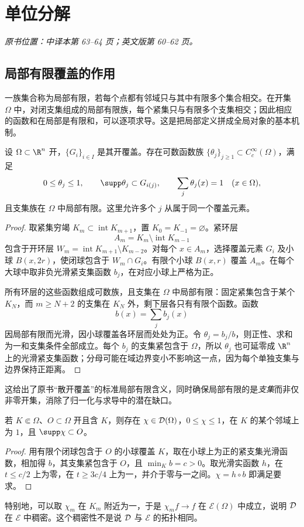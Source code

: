 \section{单位分解}\label{sec:yosida-01-12}
\noindent\textit{原书位置：中译本第 63--64 页；英文版第 60--62 页。}

\subsection{局部有限覆盖的作用}
一族集合称为局部有限，若每个点都有邻域只与其中有限多个集合相交。在开集 $\Omega$ 中，对闭支集组成的局部有限族，每个紧集只与有限多个支集相交；因此相应的函数和在局部是有限和，可以逐项求导。这是把局部定义拼成全局对象的基本机制。

\begin{theorem}[从属任意开覆盖的光滑单位分解]\label{thm:y1-partition}
设 $\Omega\subset\R^n$ 开，$\{G_i\}_{i\in I}$ 是其开覆盖。存在可数函数族 $\{\theta_j\}_{j\ge1}\subset C_c^\infty(\Omega)$，满足
\[
 0\le\theta_j\le1,\qquad \supp\theta_j\subset G_{i(j)},\qquad
 \sum_j\theta_j(x)=1\quad(x\in\Omega),
\]
且支集族在 $\Omega$ 中局部有限。这里允许多个 $j$ 从属于同一个覆盖元素。
\end{theorem}
\begin{proof}
取紧集穷竭 $K_m\subset\operatorname{int}K_{m+1}$，置 $K_0=K_{-1}=\varnothing$。紧环层
\[
 A_m=K_m\setminus\operatorname{int}K_{m-1}
\]
包含于开环层 $W_m=\operatorname{int}K_{m+1}\setminus K_{m-2}$。对每个 $x\in A_m$，选择覆盖元素 $G_i$ 及小球 $B(x,2r)$，使闭球包含于 $W_m\cap G_i$。有限个小球 $B(x,r)$ 覆盖 $A_m$。在每个大球中取非负光滑紧支集函数 $b_j$，在对应小球上严格为正。

所有环层的这些函数组成可数族，且支集在 $\Omega$ 中局部有限：固定紧集包含于某个 $K_N$，而 $m\ge N+2$ 的支集在 $K_N$ 外，剩下层各只有有限个函数。函数
\[
 b(x)=\sum_jb_j(x)
\]
因局部有限而光滑，因小球覆盖各环层而处处为正。令 $\theta_j=b_j/b$，则正性、求和为一和支集条件全部成立。每个 $b_j$ 的支集紧包含于 $\Omega$，所以 $\theta_j$ 也可延零成 $\R^n$ 上的光滑紧支集函数；分母可能在域边界变小不影响这一点，因为每个单独支集与边界保持正距离。
\end{proof}
这给出了原书“散开覆盖”的标准局部有限含义，同时确保局部有限的是\emph{支集}而非仅非零开集，消除了归一化与求导中的潜在缺口。

\begin{corollary}[光滑截断函数]\label{cor:y1-cutoff}
若 $K\Subset\Omega$、$O\subset\Omega$ 开且含 $K$，则存在 $\chi\in\mathcal{D}(\Omega)$，$0\le\chi\le1$，在 $K$ 的某个邻域上为 $1$，且 $\supp\chi\subset O$。
\end{corollary}
\begin{proof}
用有限个闭球包含于 $O$ 的小球覆盖 $K$，取在小球上为正的紧支集光滑函数，相加得 $b$，其支集紧包含于 $O$，且 $\min_K b=c>0$。取光滑实函数 $h$，在 $t\le c/2$ 上为零，在 $t\ge3c/4$ 上为一，并介于零与一之间。$\chi=h\circ b$ 即满足要求。
\end{proof}
特别地，可以取 $\chi_m$ 在 $K_m$ 附近为一，于是 $\chi_mf\to f$ 在 $\mathcal E(\Omega)$ 中成立，说明 $\mathcal{D}$ 在 $\mathcal E$ 中稠密。这个稠密性不是说 $\mathcal{D}$ 与 $\mathcal E$ 的拓扑相同。

